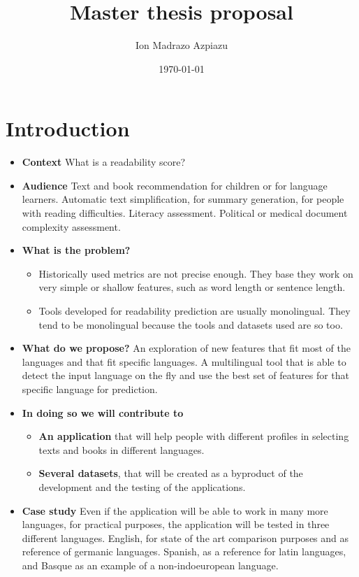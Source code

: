 \documentclass[12pt]{article}
\title{Master thesis proposal}
\author{Ion Madrazo Azpiazu}
\date{\today}
\begin{document}
\maketitle
\section{Introduction}
\begin{itemize}
\item \textbf{Context} What is a readability score?
\item \textbf{Audience} Text and book recommendation for children or for language learners. Automatic text simplification, for summary generation, for people with reading difficulties. Literacy assessment. Political or medical document complexity assessment. 
\item \textbf{What is the problem?} 
\begin{itemize}
\item Historically used metrics are not precise enough. They base they work on very simple or shallow features, such as word length or sentence length.
\item Tools developed for readability prediction are usually monolingual. They tend to be monolingual because the tools and datasets used are so too.
\end{itemize}  
\item \textbf{What do we propose?} An exploration of new features that fit most of the languages and that fit specific languages. A multilingual tool that is able to detect the input language on the fly and use the best set of features for that specific language for prediction.

\item \textbf{In doing so we will contribute to}
\begin{itemize}
\item \textbf{An application} that will help people with different profiles in selecting texts and books in different languages.
\item \textbf{Several datasets}, that will be created as a byproduct of the development and the testing of the applications. 
\end{itemize}

\item \textbf{Case study} Even if the application will be able to work in many more languages, for practical purposes, the application will be tested in three different languages. English, for state of the art comparison purposes and as reference of germanic languages. Spanish, as a reference for latin languages, and Basque as an example of a non-indoeuropean language.

\end{itemize}
\end{document}
